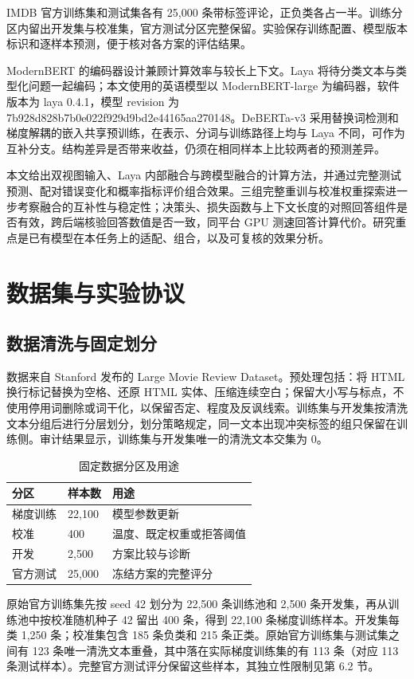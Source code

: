 \documentclass[UTF8,fontset=fandol,a4paper,11pt]{ctexart}
\begin{document}
IMDB 官方训练集和测试集各有 25,000 条带标签评论，正负类各占一半\cite{maas}。训练分区内留出开发集与校准集，官方测试分区完整保留。实验保存训练配置、模型版本标识和逐样本预测，便于核对各方案的评估结果。

ModernBERT 的编码器设计兼顾计算效率与较长上下文\cite{modernbert}。Laya 将待分类文本与类型化问题一起编码\cite{laya}；本文使用的英语模型以 ModernBERT-large 为编码器，软件版本为 laya 0.4.1，模型 revision 为 7b928d828b7b0e022f929d9bd2e44165aa270148。DeBERTa-v3 采用替换词检测和梯度解耦的嵌入共享预训练\cite{deberta}，在表示、分词与训练路径上均与 Laya 不同，可作为互补分支。结构差异是否带来收益，仍须在相同样本上比较两者的预测差异。

本文给出双视图输入、Laya 内部融合与跨模型融合的计算方法，并通过完整测试预测、配对错误变化和概率指标评价组合效果。三组完整重训与校准权重探索进一步考察融合的互补性与稳定性；决策头、损失函数与上下文长度的对照回答组件是否有效，跨后端核验回答数值是否一致，同平台 GPU 测速回答计算代价。研究重点是已有模型在本任务上的适配、组合，以及可复核的效果分析。

\section{数据集与实验协议}
\subsection{数据清洗与固定划分}
数据来自 Stanford 发布的 Large Movie Review Dataset\cite{maas}。预处理包括：将 HTML 换行标记替换为空格、还原 HTML 实体、压缩连续空白；保留大小写与标点，不使用停用词删除或词干化，以保留否定、程度及反讽线索。训练集与开发集按清洗文本分组后进行分层划分，划分策略规定，同一文本出现冲突标签的组只保留在训练侧。审计结果显示，训练集与开发集唯一的清洗文本交集为 0。

\begin{table}[htbp]\centering\caption{固定数据分区及用途}\label{tab:t1}\small\renewcommand{\arraystretch}{1.25}
\begin{tabularx}{\linewidth}{YYY}\toprule
\textbf{分区} & \textbf{样本数} & \textbf{用途}\\\midrule
梯度训练 & 22,100 & 模型参数更新\\
校准 & 400 & 温度、既定权重或拒答阈值\\
开发 & 2,500 & 方案比较与诊断\\
官方测试 & 25,000 & 冻结方案的完整评分\\
\bottomrule\end{tabularx}\end{table}
原始官方训练集先按 seed 42 划分为 22,500 条训练池和 2,500 条开发集，再从训练池中按校准随机种子 42 留出 400 条，得到 22,100 条梯度训练样本。开发集每类 1,250 条；校准集包含 185 条负类和 215 条正类。原始官方训练集与测试集之间有 123 条唯一清洗文本重叠，其中落在实际梯度训练集的有 113 条（对应 113 条测试样本）。完整官方测试评分保留这些样本，其独立性限制见第 6.2 节。
\end{document}
